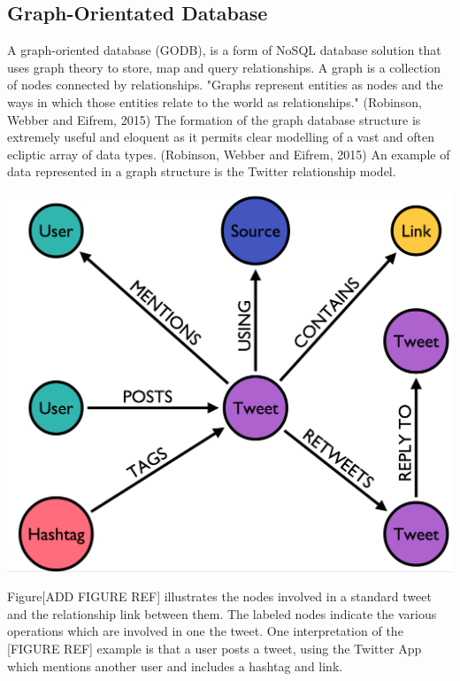 \subsection{Graph-Orientated Database}
A graph-oriented database (GODB), is a form of NoSQL database solution that uses graph theory to store, map and query relationships. A graph is a collection of nodes connected by relationships. "Graphs represent entities as nodes and the ways in which those entities relate to the world as relationships." (Robinson, Webber and Eifrem, 2015) The formation of the graph database structure is extremely useful and eloquent as it permits clear modelling of a vast and often ecliptic array of data types. (Robinson, Webber and Eifrem, 2015) An example of data represented in a graph structure is the Twitter relationship model. \begin{center}\includegraphics[width=0.5\linewidth]{images/graphdb_twitter}\end{center}  Figure[ADD FIGURE REF] illustrates the nodes involved in a standard tweet and the relationship link between them. The labeled nodes indicate the various operations which are involved in one the tweet. One interpretation of the [FIGURE REF] example is that a user posts a tweet, using the Twitter App which mentions another user and includes a hashtag and link.

